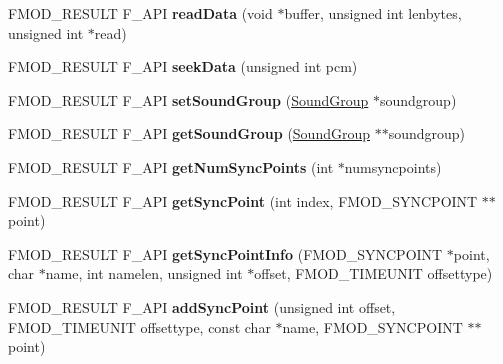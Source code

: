 \begin{DoxyCompactItemize}
F\+M\+O\+D\+\_\+\+R\+E\+S\+U\+LT F\+\_\+\+A\+PI {\bfseries read\+Data} (void $\ast$buffer, unsigned int lenbytes, unsigned int $\ast$read)
\item 
\mbox{\label{classFMOD_1_1Sound_ac73572153744ba36367391939cd3bc5e}} 
F\+M\+O\+D\+\_\+\+R\+E\+S\+U\+LT F\+\_\+\+A\+PI {\bfseries seek\+Data} (unsigned int pcm)
\item 
\mbox{\label{classFMOD_1_1Sound_a6433c4494cbb472ef1d9cf214749dc01}} 
F\+M\+O\+D\+\_\+\+R\+E\+S\+U\+LT F\+\_\+\+A\+PI {\bfseries set\+Sound\+Group} (\hyperlink{classFMOD_1_1SoundGroup}{Sound\+Group} $\ast$soundgroup)
\item 
\mbox{\label{classFMOD_1_1Sound_a146bf9b59d99685b313f95e3460a4b8b}} 
F\+M\+O\+D\+\_\+\+R\+E\+S\+U\+LT F\+\_\+\+A\+PI {\bfseries get\+Sound\+Group} (\hyperlink{classFMOD_1_1SoundGroup}{Sound\+Group} $\ast$$\ast$soundgroup)
\item 
\mbox{\label{classFMOD_1_1Sound_a3a8c9fd2fb487a3b3a66952f09840fbf}} 
F\+M\+O\+D\+\_\+\+R\+E\+S\+U\+LT F\+\_\+\+A\+PI {\bfseries get\+Num\+Sync\+Points} (int $\ast$numsyncpoints)
\item 
\mbox{\label{classFMOD_1_1Sound_ab091d9a05e5f30f7a3ffbe1503335d32}} 
F\+M\+O\+D\+\_\+\+R\+E\+S\+U\+LT F\+\_\+\+A\+PI {\bfseries get\+Sync\+Point} (int index, F\+M\+O\+D\+\_\+\+S\+Y\+N\+C\+P\+O\+I\+NT $\ast$$\ast$point)
\item 
\mbox{\label{classFMOD_1_1Sound_a99aa787828a6fa111ba2663a3c35b6e0}} 
F\+M\+O\+D\+\_\+\+R\+E\+S\+U\+LT F\+\_\+\+A\+PI {\bfseries get\+Sync\+Point\+Info} (F\+M\+O\+D\+\_\+\+S\+Y\+N\+C\+P\+O\+I\+NT $\ast$point, char $\ast$name, int namelen, unsigned int $\ast$offset, F\+M\+O\+D\+\_\+\+T\+I\+M\+E\+U\+N\+IT offsettype)
\item 
\mbox{\label{classFMOD_1_1Sound_abb46f258c1ac4563f20b17a4647b0dc0}} 
F\+M\+O\+D\+\_\+\+R\+E\+S\+U\+LT F\+\_\+\+A\+PI {\bfseries add\+Sync\+Point} (unsigned int offset, F\+M\+O\+D\+\_\+\+T\+I\+M\+E\+U\+N\+IT offsettype, const char $\ast$name, F\+M\+O\+D\+\_\+\+S\+Y\+N\+C\+P\+O\+I\+NT $\ast$$\ast$point)
\item 
\mbox{\label{classFMOD_1_1Sound_a21e86318ac39e576111e642b57db4187}} 
$$
\end{DoxyCompactItemize}
